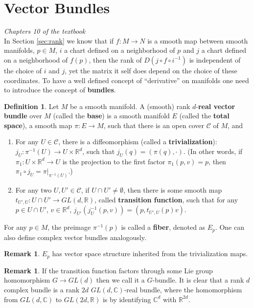 \documentclass{article}
\theoremstyle{definition}
\newtheorem{dfn}[thm]{Definition}
\newtheorem{rmk}[thm]{Remark}
\begin{document}
\section{Vector Bundles}

{\em Chapters 10 of the textbook}\\

In Section \ref{sec:rank} we know that if $f: M\rightarrow N$ is a smooth map between smooth manifolds, $p\in M$, $i$ a chart defined on a neighborhood of $p$ and $j$ a chart defined on a neighborhood of $f(p)$, then the rank of $D(j\circ f\circ i^{-1})$ is independent of the choice of $i$ and $j$, yet the matrix it self does depend on the choice of these coordinates. To have a well defined concept of ``derivative'' on manifolds one need to introduce the concept of {\bf bundles}.

\begin{dfn}\label{vb}
    Let $M$ be a smooth manifold. A (smooth) rank $d$-{\bf real vector bundle} over $M$ (called the {\bf base}) is a smooth manifold $E$ (called the {\bf total space}), a smooth map $\pi: E\rightarrow M$, such that there is an open cover $\mathcal{C}$ of $M$, and
\begin{enumerate}
    \item For any $U\in\mathcal{C}$, there is a diffeomorphism (called a {\bf trivialization}): $j_U: \pi^{-1}(U)\rightarrow U\times\mathbb{R}^d$, such that $j_U(q)=(\pi(q), \cdot)$. (In other words, if $\pi_1: U\times \mathbb{R}^d\rightarrow U$ is the projection to the first factor $\pi_1(p, v)=p$, then $\pi_1\circ j_U=\pi|_{\pi^{-1}(U)}$.)
    \item For any two $U, U'\in\mathcal{C}$, if $U\cap U'\not=\emptyset$, then there is some smooth map $t_{U', U}: U\cap U'\rightarrow GL(d, \mathbb{R})$, called {\bf transition function}, such that for any $p\in U\cap U'$, $v\in\mathbb{R}^d$, $j_{U'}(j_U^{-1}(p, v))=(p, t_{U', U}(p)v)$.
\end{enumerate}
  For any $p\in M$, the preimage $\pi^{-1}(p)$ is called a {\bf fiber}, denoted as $E_p$. One can also define complex vector bundles analogously.
\end{dfn}  

\begin{rmk}
    $E_p$ has vector space structure inherited from the trivialization maps.
\end{rmk}

\begin{rmk}
  If the transition function factors through some Lie group homomorphism $G\rightarrow GL(d)$ then we call it a $G$-bundle. It is clear that a rank $d$ complex bundle is a rank $2d$ $GL(d, \mathbb{C})$-real bundle, where the homomorphism from $GL(d, \mathbb{C})$ to $GL(2d, \mathbb{R})$ is by identifying $\mathbb{C}^d$ with $\mathbb{R}^{2d}$.
\end{rmk}
\end{document}
